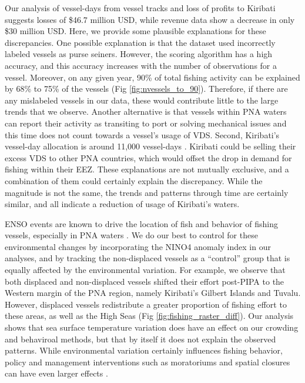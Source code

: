 \documentclass[9p,twocolumn,twoside,lineno]{pnas-new}
\begin{document}
Our analysis of vessel-days from vessel tracks and loss of profits to Kiribati suggests losses of \$46.7 million USD, while revenue data show a decrease in only \$30 million USD. Here, we provide some plausible explanations for these discrepancies. One possible explanation is that the dataset used incorrectly labeled vessels as purse seiners. However, the scoring algorithm has a high accuracy, and this accuracy increases with the number of observations for a vessel. Moreover, on any given year, 90\% of total fishing activity can be explained by 68\% to 75\% of the vessels (Fig \ref{fig:nvessels_to_90}). Therefore, if there are any mislabeled vessels in our data, these would contribute little to the large trends that we observe. Another alternative is that vessels within PNA waters can report their activity as transiting to port or solving mechanical issues and this time does not count towards a vessel's usage of VDS. Second, Kiribati's vessel-day allocation is around 11,000 vessel-days \citep{yeeting2018stabilising}. Kiribati could be selling their excess VDS to other PNA countries, which would offset the drop in demand for fishing within their EEZ. These explanations are not mutually exclusive, and a combination of them could certainly explain the discrepancy. While the magnitude is not the same, the trends and patterns through time are certainly similar, and all indicate a reduction of usage of Kiribati's waters.

ENSO events are known to drive the location of fish and behavior of fishing vessels, especially in PNA waters \cite{lehodey_1997,kroodsma_2018,aqorau_2018}. We do our best to control for these environmental changes by incorporating the NINO4 anomaly index in our analyses, and by tracking the non-displaced vessels as a ``control'' group that is equally affected by the environmental variation. For example, we observe that both displaced and non-displaced vessels shifted their effort post-PIPA to the Western margin of the PNA region, namely Kiribati's Gilbert Islands and Tuvalu. However, displaced vessels redistribute a greater proportion of fishing effort to these areas, as well as the High Seas (Fig \ref{fig:fishing_raster_diff}). Our analysis shows that sea surface temperature variation does have an effect on our crowding and behaviroal methods, but that by itself it does not explain the observed patterns. While environmental variation certainly influences fishing behavior, policy and management interventions such as moratoriums and spatial closures can have even larger effects \cite{kroodsma_2018}.
\end{document}
